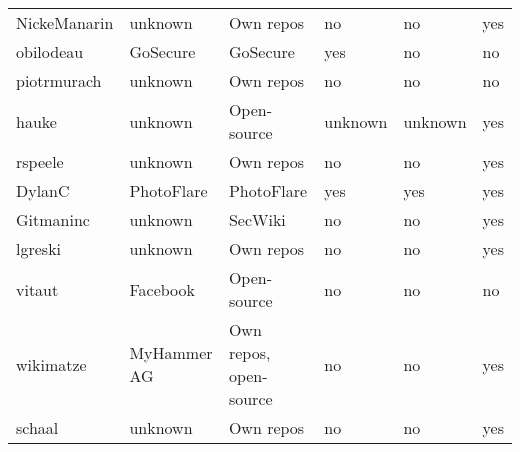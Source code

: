 \begin{landscape}
\begin{table}[]
\begin{tabular}{llllll}
            NickeManarin  & unknown       & Own repos                          & no              & no                     & yes            \\
            obilodeau     & GoSecure      & GoSecure                           & yes             & no                     & no             \\
            piotrmurach   & unknown       & Own repos                          & no              & no                     & no             \\
            hauke         & unknown       & Open-source                        & unknown         & unknown                & yes            \\
            rspeele       & unknown       & Own repos                          & no              & no                     & yes            \\
            DylanC        & PhotoFlare    & PhotoFlare                         & yes             & yes                    & yes            \\
            Gitmaninc     & unknown       & SecWiki                            & no              & no                     & yes            \\
            lgreski       & unknown       & Own repos                          & no              & no                     & yes            \\
            vitaut        & Facebook      & Open-source                        & no              & no                     & no             \\
            wikimatze     & MyHammer AG   & Own repos, open-source             & no              & no                     & yes            \\
            schaal        & unknown       & Own repos                          & no              & no                     & yes
        \end{tabular}
    \end{table}
\end{landscape}

